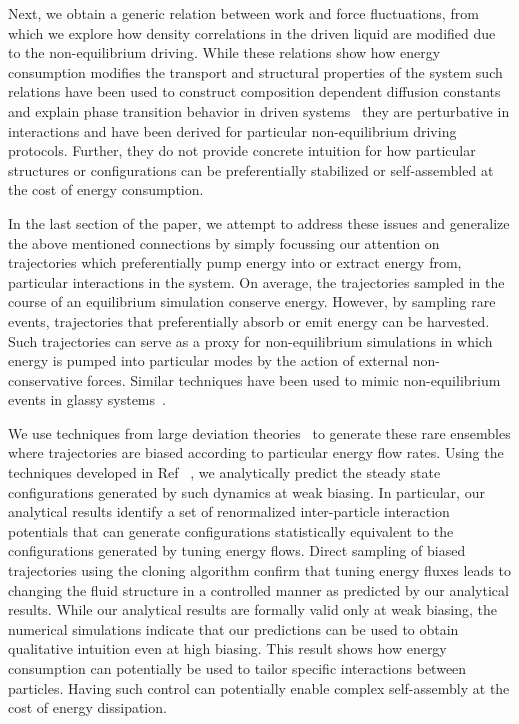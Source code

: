 \documentclass[pre, superscriptaddress, twocolumn,pre]{revtex4-1}
\begin{document}
Next, we obtain a generic relation between work and force fluctuations, from which we explore how density correlations in the driven liquid are modified due to the non-equilibrium driving. While these relations show how energy consumption modifies the transport and structural properties of the system \textendash such relations have been used to construct composition dependent diffusion constants and explain phase transition behavior in driven systems~\cite{delJunco2018} \textendash they are perturbative in interactions and have been derived for particular non-equilibrium driving protocols. Further, they do not provide concrete intuition for how particular structures or configurations can be preferentially stabilized or self-assembled at the cost of energy consumption. 

In the last section of the paper, we attempt to address these issues and generalize the above mentioned connections by simply focussing our attention on trajectories which preferentially pump energy into or extract energy from, particular interactions in the system. On average, the trajectories sampled in the course of an equilibrium simulation conserve energy. However, by sampling rare events, trajectories that preferentially absorb or emit energy can be harvested. Such trajectories can serve as a proxy for non-equilibrium simulations in which energy is pumped into particular modes by the action of external non-conservative forces. Similar techniques have been used to mimic non-equilibrium events in glassy systems~\cite{garrahan2007,Hedges2009}. 

We use techniques from large deviation theories~\cite{garrahan2007, Hedges2009, Pitard2011, Speck2012, Bodineau2012a, Limmer2014, Nemoto2017} to generate these rare ensembles where trajectories are biased according to particular energy flow rates. Using the techniques developed in  Ref ~\cite{Chetrite2013, Jack2010}, we analytically predict the steady state configurations generated by such dynamics at weak biasing. In particular, our analytical results identify a set of renormalized inter-particle interaction potentials that can generate configurations statistically equivalent to the configurations generated by tuning energy flows. 
Direct sampling of biased trajectories using the cloning algorithm \cite{Giadina2006,tailleur2007probing,Hurtado2009,Nemoto2016,Ray2018,Klymko2018,Brewer2018} confirm that tuning energy fluxes leads to changing the fluid structure in a controlled manner as predicted by our analytical results. While our analytical results are formally valid only at weak biasing, the numerical simulations indicate that our predictions can be used to obtain qualitative intuition even at high biasing. This result shows how energy consumption can potentially be used to tailor specific interactions between particles. Having such control can potentially enable complex self-assembly at the cost of energy dissipation. 
\end{document}
